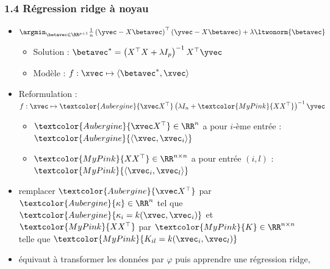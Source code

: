 \begin{frame}
  \frametitle{1.4 Régression ridge à noyau}
  \begin{itemize}
  \item {}
    {\footnotesize $\argmin_{\betavec \in \RR^{p+1}} \frac1n \left(\yvec - X \betavec \right)^\top
      \left(\yvec - X \betavec \right) + \lambda \ltwonorm{\betavec} $}      
    \begin{itemize}
    \item Solution : $\betavec^* = \left(X^\top X + \lambda I_p \right)^{-1} X^\top \yvec$
    \item Modèle : $f: \xvec \mapsto \langle \betavec^*, \xvec \rangle$
    \end{itemize}
  \item Reformulation :
    $f: \xvec \mapsto \textcolor{Aubergine}{\xvec X^\top} \left( \lambda I_n +
      \textcolor{MyPink}{XX^\top} \right)^{-1} \yvec $
    \pause
    \begin{itemize}
    \item $\textcolor{Aubergine}{\xvec X^\top} \in \RR^n$ a pour $i$-ème entrée :
      $\textcolor{Aubergine}{\langle \xvec, \xvec_i \rangle}$    
    \item $\textcolor{MyPink}{X X^\top} \in \RR^{n \times n}$ a pour entrée $(i,l)$ :
      $\textcolor{MyPink}{\langle \xvec_i, \xvec_l \rangle}$
    \end{itemize}
    \pause
  \item {} remplacer $\textcolor{Aubergine}{\xvec X^\top}$ par
    $\textcolor{Aubergine}{\kappa} \in \RR^n$ tel que
    $\textcolor{Aubergine}{\kappa_i = k(\xvec, \xvec_i)}$ et $\textcolor{MyPink}{XX^\top}$ par
    $\textcolor{MyPink}{K} \in \RR^{n \times n}$ telle que $\textcolor{MyPink}{K_{il} = k(\xvec_i, \xvec_l)}$
  \item[] équivaut à transformer les données par $\varphi$ puis apprendre une régression ridge, 
  \end{itemize}
\end{frame}

